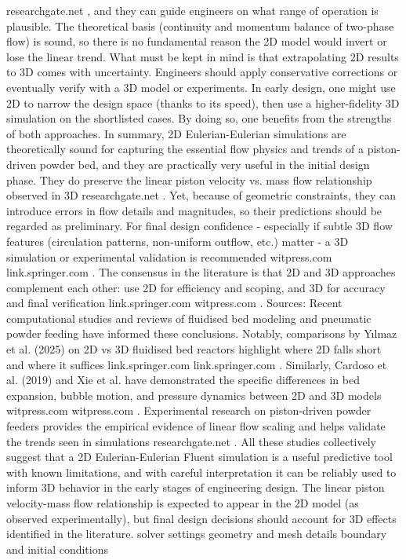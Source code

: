 researchgate.net
, and they can guide engineers on what range of operation is plausible. The theoretical basis (continuity and momentum balance of two-phase flow) is sound, so there is no fundamental reason the 2D model would invert or lose the linear trend. What must be kept in mind is that extrapolating 2D results to 3D comes with uncertainty. Engineers should apply conservative corrections or eventually verify with a 3D model or experiments. In early design, one might use 2D to narrow the design space (thanks to its speed), then use a higher-fidelity 3D simulation on the shortlisted cases. By doing so, one benefits from the strengths of both approaches. In summary, 2D Eulerian-Eulerian simulations are theoretically sound for capturing the essential flow physics and trends of a piston-driven powder bed, and they are practically very useful in the initial design phase. They do preserve the linear piston velocity vs. mass flow relationship observed in 3D
researchgate.net
. Yet, because of geometric constraints, they can introduce errors in flow details and magnitudes, so their predictions should be regarded as preliminary. For final design confidence - especially if subtle 3D flow features (circulation patterns, non-uniform outflow, etc.) matter - a 3D simulation or experimental validation is recommended
witpress.com
link.springer.com
. The consensus in the literature is that 2D and 3D approaches complement each other: use 2D for efficiency and scoping, and 3D for accuracy and final verification
link.springer.com
witpress.com
. Sources: Recent computational studies and reviews of fluidised bed modeling and pneumatic powder feeding have informed these conclusions. Notably, comparisons by Yılmaz et al. (2025) on 2D vs 3D fluidised bed reactors highlight where 2D falls short and where it suffices
link.springer.com
link.springer.com
. Similarly, Cardoso et al. (2019) and Xie et al. have demonstrated the specific differences in bed expansion, bubble motion, and pressure dynamics between 2D and 3D models
witpress.com
witpress.com
. Experimental research on piston-driven powder feeders provides the empirical evidence of linear flow scaling and helps validate the trends seen in simulations
researchgate.net
. All these studies collectively suggest that a 2D Eulerian-Eulerian Fluent simulation is a useful predictive tool with known limitations, and with careful interpretation it can be reliably used to inform 3D behavior in the early stages of engineering design. The linear piston velocity-mass flow relationship is expected to appear in the 2D model (as observed experimentally), but final design decisions should account for 3D effects identified in the literature.
solver settings
geometry and mesh details
boundary and initial conditions